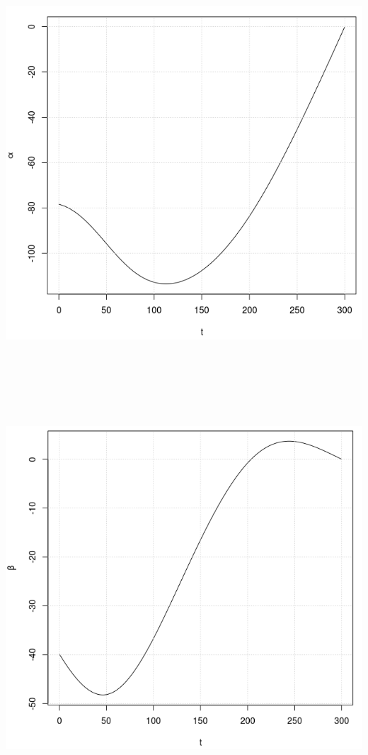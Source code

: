 \documentclass[14pt]{extreport}
\begin{document}
\begin{landscape}
\begin{center}
\includegraphics[width=15cm, height=15cm]{alpha.png}
\end{center}
\end{landscape}

\begin{landscape}
\begin{center}
\includegraphics[width=15cm, height=15cm]{beta.png}
\end{center}
\end{landscape}
\end{document}
